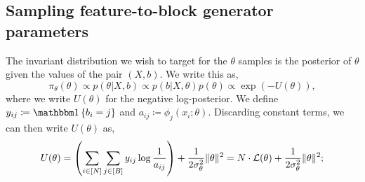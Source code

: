 \subsection{Sampling feature-to-block generator parameters}
\label{s:sfb}

The invariant distribution we wish to target for the $\theta$ samples is the posterior of $\theta$ given the values of the pair $(X, b)$. 
We write this as,
%
\begin{equation}
	\pi_\theta(\theta) \propto p(\theta | X, b) \propto p(b | X, \theta) p(\theta) \propto  \exp \left( - U(\theta) \right),
	\label{eq:U}
\end{equation}
%
where we write $U(\theta)$ for the negative log-posterior. We define $y_{ij} \coloneqq \one \left\{ b_i = j \right\}$ and $a_{ij} \coloneqq \phi_j(x_i; \theta)$. 
Discarding constant terms, we can then write $U(\theta)$ as,
%
\begin{equation}
	U(\theta) = \left( \sum_{i \in [N]} \sum_{j \in [B]} y_{ij} \log \frac{1}{a_{ij}} \right)
	+ \frac{1}{2\sigma_\theta^2} \|\theta\|^2 = N \cdot \mathcal{L}(\theta) + \frac{1}{2\sigma_\theta^2} \|\theta\|^2;
	\label{eqn:U-form}
\end{equation}

